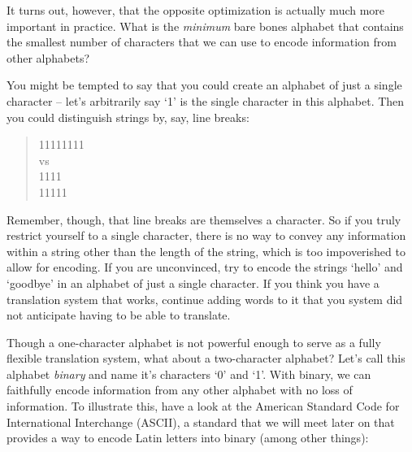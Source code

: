 \documentclass[UTF8]{book}
\begin{document}
\begin{CJK}{UTF8}{gbsn}
It turns out, however, that the opposite optimization is actually much more important in practice. What is the \emph{minimum} bare bones alphabet that contains the smallest number of characters that we can use to encode information from other alphabets?

You might be tempted to say that you could create an alphabet of just a single character -- let's arbitrarily say `1' is the single character in this alphabet. Then you could distinguish strings by, say, line breaks:

\begin{quotation}
\centering

11111111 \\

vs \\

1111 \\
11111

\end{quotation}

Remember, though, that line breaks are themselves a character. So if you truly restrict yourself to a single character, there is no way to convey any information within a string other than the length of the string, which is too impoverished to allow for encoding. If you are unconvinced, try to encode the strings `hello' and `goodbye' in an alphabet of just a single character. If you think you have a translation system that works, continue adding words to it that you system did not anticipate having to be able to translate.

Though a one-character alphabet is not powerful enough to serve as a fully flexible translation system, what about a two-character alphabet? Let's call this alphabet \emph{binary} and name it's characters `0' and `1'. With binary, we can faithfully encode information from any other alphabet with no loss of information. To illustrate this, have a look at the American Standard Code for International Interchange (ASCII), a standard that we will meet later on that provides a way to encode Latin letters into binary (among other things):


\end{CJK}
\end{document}
